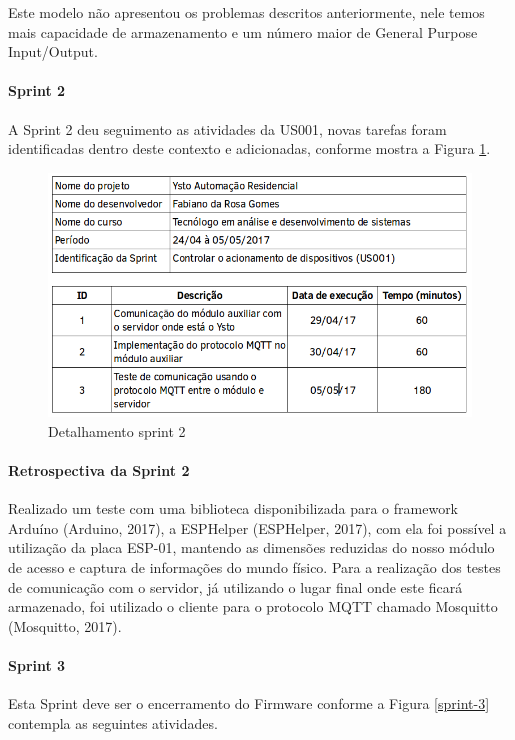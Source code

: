 Este modelo não apresentou os problemas descritos anteriormente, nele temos mais capacidade de armazenamento e um número maior de General Purpose Input/Output.


\paragraph{Sprint 2} A Sprint 2 deu seguimento as atividades da US001, novas tarefas foram identificadas dentro deste contexto e adicionadas, conforme mostra a Figura \ref{sprint-2}.

\begin{figure}[H]
\caption{\label{sprint-2} Detalhamento sprint 2}
\includegraphics[scale=0.5]{img/sprint-2.png}
\end{figure}

\paragraph{Retrospectiva da Sprint 2} Realizado um teste com uma biblioteca disponibilizada para o framework Arduíno (Arduino, 2017), a ESPHelper (ESPHelper, 2017), com ela foi possível a utilização da placa ESP-01, mantendo as dimensões reduzidas do nosso módulo de acesso e captura de informações do mundo físico. Para a realização dos testes de comunicação com o servidor, já utilizando o lugar final onde este ficará armazenado, foi utilizado o cliente para o protocolo MQTT chamado Mosquitto (Mosquitto, 2017).

\paragraph{Sprint 3} Esta Sprint deve ser o encerramento do Firmware conforme a Figura \ref{sprint-3} contempla as seguintes atividades.

